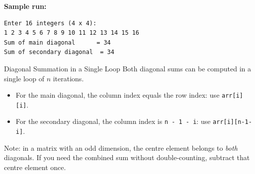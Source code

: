 \textbf{Sample run:}
\begin{verbatim}
Enter 16 integers (4 x 4):
1 2 3 4 5 6 7 8 9 10 11 12 13 14 15 16
Sum of main diagonal      = 34
Sum of secondary diagonal  = 34
\end{verbatim}

\begin{importantbox}{Diagonal Summation in a Single Loop}
Both diagonal sums can be computed in a single loop of $n$ iterations.
\begin{itemize}
    \item For the main diagonal, the column index equals the row
          index: use \texttt{arr[i][i]}.
    \item For the secondary diagonal, the column index is
          \texttt{n\,-\,1\,-\,i}: use \texttt{arr[i][n-1-i]}.
\end{itemize}
Note: in a matrix with an odd dimension, the centre element belongs to
\emph{both} diagonals. If you need the combined sum without
double-counting, subtract that centre element once.
\end{importantbox}
